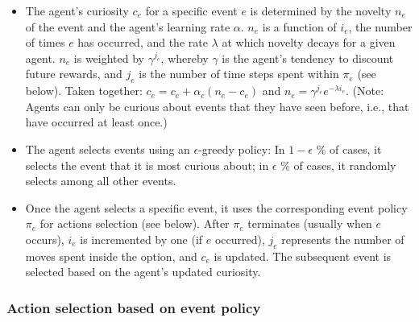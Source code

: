 \documentclass{article}
\begin{document}
\begin{itemize}
	\item The agent's curiosity $c_e$ for a specific event $e$ is determined by the novelty $n_e$ of the event and the agent's learning rate $\alpha$. $n_e$ is a function of $i_e$, the number of times $e$ has occurred, and the rate $\lambda$ at which novelty decays for a given agent. $n_e$ is weighted by $\gamma^{j_e}$, whereby $\gamma$ is the agent's tendency to discount future rewards, and $j_e$ is the number of time steps spent within $\pi_e$ (see below). Taken together: $c_e = c_e + \alpha_c (n_e - c_e)$ and $n_e = \gamma^{j_e} e^{-\lambda i_e}$. (Note: Agents can only be curious about events that they have seen before, i.e., that have occurred at least once.)
	\item The agent selects events using an $\epsilon$-greedy policy: In $1-\epsilon$ \% of cases, it selects the event that it is most curious about; in $\epsilon$ \% of cases, it randomly selects among all other events.
	\item Once the agent selects a specific event, it uses the corresponding event policy $\pi_e$ for actions selection (see below). After $\pi_e$ terminates (usually when $e$ occurs), $i_e$ is incremented by one (if $e$ occurred), $j_e$ represents the number of moves spent inside the option, and $c_e$ is updated. The subsequent event is selected based on the agent's updated curiosity. 
\end{itemize}

\subsubsection{Action selection based on event policy}
\end{document}

